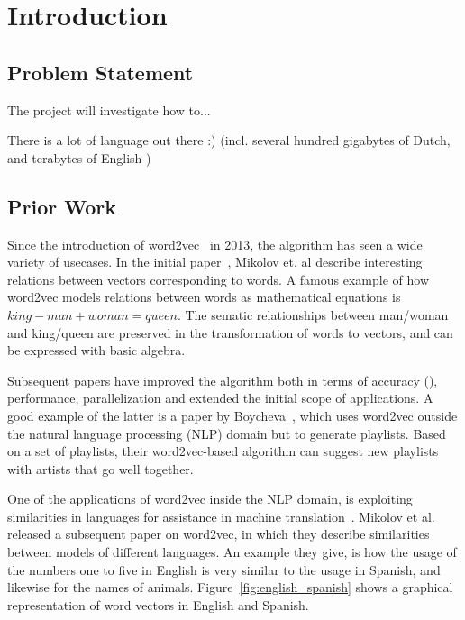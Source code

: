 \section{Introduction}


\subsection{Problem Statement}
The project will investigate how to...

There is a lot of language out there :) (incl. several hundred gigabytes of Dutch, and terabytes of English \cite{buck2014n})

\subsection{Prior Work}
\label{sec:prior_work}
Since the introduction of word2vec~\cite{mikolov2013efficient, mikolov2013distributed} in 2013, the algorithm has seen a wide variety of usecases. In the initial paper~\cite{mikolov2013efficient}, Mikolov et. al describe interesting relations between vectors corresponding to words. 
A famous example of how word2vec models relations between words as mathematical equations is $king - man + woman = queen$.
The sematic relationships between man/woman and king/queen are preserved in the transformation of words to vectors, and can be expressed with basic algebra.

Subsequent papers have improved the algorithm both in terms of accuracy (\cite{levy2014linguistic}), performance, parallelization and extended the initial scope of applications. A good example of the latter is a paper by Boycheva~\cite{boycheva2015distributional}, which uses word2vec outside the natural language processing (NLP) domain but to generate playlists. Based on a set of playlists, their word2vec-based algorithm can suggest new playlists with artists that go well together.

One of the applications of word2vec inside the NLP domain, is exploiting similarities in languages for assistance in machine translation~\cite{wolf2014joint}. Mikolov et al.~\cite{mikolov2013exploiting} released a subsequent paper on word2vec, in which they describe similarities between models of different languages. An example they give, is how the usage of the numbers one to five in English is very similar to the usage in Spanish, and likewise for the names of animals. Figure~\ref{fig:english_spanish} shows a graphical representation of word vectors in English and Spanish.

